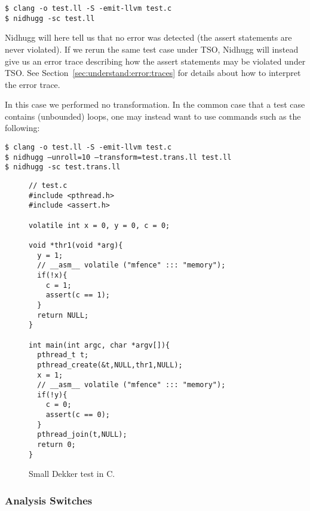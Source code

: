 \documentclass[a4paper]{article}
\begin{document}
\vspace{5pt}
\noindent
\texttt{\$ clang -o test.ll -S -emit-llvm test.c}\\
\texttt{\$ nidhugg -sc test.ll}

\vspace{5pt}\noindent
%
Nidhugg will here tell us that no error was detected (the assert
statements are never violated). If we rerun the same test case under
TSO, Nidhugg will instead give us an error trace describing how the
assert statements may be violated under TSO. See
Section~\ref{sec:understand:error:traces} for details about how to
interpret the error trace.

In this case we performed no transformation. In the common case that
a test case contains (unbounded) loops, one may instead
want to use commands such as the following:

\vspace{5pt}
\noindent
\texttt{\$ clang -o test.ll -S -emit-llvm test.c}\\
\texttt{\$ nidhugg --unroll=10 --transform=test.trans.ll test.ll}\\
\texttt{\$ nidhugg -sc test.trans.ll}

\begin{figure}
\begin{verbatim}
// test.c
#include <pthread.h>
#include <assert.h>

volatile int x = 0, y = 0, c = 0;

void *thr1(void *arg){
  y = 1;
  // __asm__ volatile ("mfence" ::: "memory");
  if(!x){
    c = 1;
    assert(c == 1);
  }
  return NULL;
}

int main(int argc, char *argv[]){
  pthread_t t;
  pthread_create(&t,NULL,thr1,NULL);
  x = 1;
  // __asm__ volatile ("mfence" ::: "memory");
  if(!y){
    c = 0;
    assert(c == 0);
  }
  pthread_join(t,NULL);
  return 0;
}
\end{verbatim}
  \caption{Small Dekker test in C.}\label{fig:dekker:c}
\end{figure}

\subsubsection{Analysis Switches}\label{sec:analysis:switches}
\end{document}
